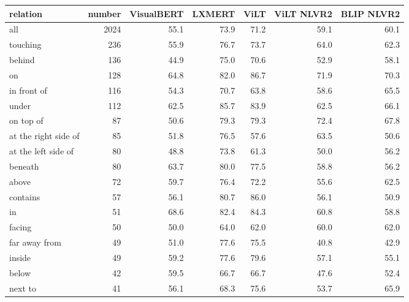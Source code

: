 \begin{table}[ht]
\centering
\begin{tabular}{lrrrrrr}
\toprule
relation &  number &  VisualBERT &  LXMERT &  ViLT &  ViLT NLVR2 &  BLIP NLVR2 \\
\midrule
all                  &    2024 &        55.1 &    73.9 &  71.2 &        59.1 &        60.1 \\
\midrule
touching             &     236 &        55.9 &    76.7 &  73.7 &        64.0 &        62.3 \\
behind               &     136 &        44.9 &    75.0 &  70.6 &        52.9 &        58.1 \\
on                   &     128 &        64.8 &    82.0 &  86.7 &        71.9 &        70.3 \\
in front of          &     116 &        54.3 &    70.7 &  63.8 &        58.6 &        65.5 \\
under                &     112 &        62.5 &    85.7 &  83.9 &        62.5 &        66.1 \\
on top of            &      87 &        50.6 &    79.3 &  79.3 &        72.4 &        67.8 \\
at the right side of &      85 &        51.8 &    76.5 &  57.6 &        63.5 &        50.6 \\
at the left side of  &      80 &        48.8 &    73.8 &  61.3 &        50.0 &        56.2 \\
beneath              &      80 &        63.7 &    80.0 &  77.5 &        58.8 &        56.2 \\
above                &      72 &        59.7 &    76.4 &  72.2 &        55.6 &        62.5 \\
contains             &      57 &        56.1 &    80.7 &  86.0 &        56.1 &        50.9 \\
in                   &      51 &        68.6 &    82.4 &  84.3 &        60.8 &        58.8 \\
facing               &      50 &        50.0 &    64.0 &  62.0 &        60.0 &        62.0 \\
far away from        &      49 &        51.0 &    77.6 &  75.5 &        40.8 &        42.9 \\
inside               &      49 &        59.2 &    77.6 &  79.6 &        57.1 &        55.1 \\
below                &      42 &        59.5 &    66.7 &  66.7 &        47.6 &        52.4 \\
next to              &      41 &        56.1 &    68.3 &  75.6 &        53.7 &        65.9 \\

\end{tabular}
\end{table}
